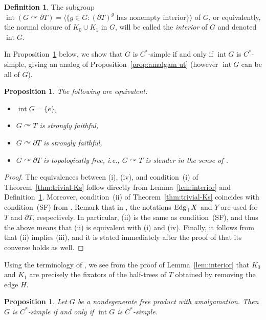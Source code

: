 \documentclass[a4paper]{amsart}
\theoremstyle{plain}
\newtheorem{proposition}[theorem]{Proposition}
\theoremstyle{definition}
\newtheorem{definition}[theorem]{Definition}
\theoremstyle{remark}
\numberwithin{theorem}{section}
\begin{document}
\begin{definition}\label{def:int-G}
The subgroup $\operatorname{int}(G\curvearrowright\partial T)=\langle\{g\in G:(\partial T)^g\text{ has nonempty interior}\}\rangle$
of $G$, or equivalently, the normal closure of $K_0\cup K_1$ in $G$,
will be called the \emph{interior} of $G$ and denoted $\operatorname{int} G$.
\end{definition}

In Proposition~\ref{prop:cstarsimple-int} below, we show that $G$ is $C^*$-simple if and only if $\operatorname{int} G$ is $C^*$-simple,
giving an analog of Proposition~\ref{prop:amalgam ut} (however $\operatorname{int} G$ can be all of $G$).

\begin{proposition}\label{prop:slender}
The following are equivalent:
\begin{itemize}
\item[(i)] $\operatorname{int} G=\{e\}$,
\item[(ii)] $G\curvearrowright T$ is strongly faithful,
\item[(iii)] $G\curvearrowright \partial T$ is strongly faithful,
\item[(iv)] $G\curvearrowright \partial T$ is topologically free, i.e., $G\curvearrowright T$ is slender in the sense of \cite{HP}.
\end{itemize}
\end{proposition}

\begin{proof}
The equivalences between (i), (iv), and condition~(i) of Theorem~\ref{thm:trivial-Ks} follow directly from Lemma~\ref{lem:interior} and Definition~\ref{def:int-G}.
Moreover, condition~(ii) of Theorem~\ref{thm:trivial-Ks} coincides with condition~(SF) from \cite[p.~245]{Harpe}.
Remark that in \cite{Harpe}, the notations $\textup{Edg}_+X$ and $Y$ are used for $T$ and $\partial T$, respectively.
In particular, (ii) is the same as condition~(SF), and thus the above means that (ii) is equivalent with (i) and (iv).
Finally, it follows from \cite[Lemma~9]{Harpe} that (ii) implies (iii),
and it is stated immediately after the proof of \cite[Lemma~9]{Harpe} that its converse holds as well.
\end{proof}

Using the terminology of \cite{Boudec}, we see from the proof of Lemma~\ref{lem:interior}
that $K_0$ and $K_1$ are precisely the fixators of the half-trees of $T$ obtained by removing the edge $H$.

\begin{proposition}\label{prop:cstarsimple-int}
Let $G$ be a nondegenerate free product with amalgamation.
Then $G$ is $C^*$-simple if and only if $\operatorname{int} G$ is $C^*$-simple.
\end{proposition}
\end{document}
